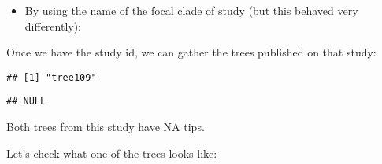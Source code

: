 \documentclass[draft]{ametsoc}
\begin{document}
\begin{itemize}
\tightlist
\item
  By using the name of the focal clade of study (but this behaved very
  differently):
\end{itemize}

\begin{Shaded}
\begin{Highlighting}[]
\OperatorTok{::}\NormalTok{(}\NormalTok{, }\NormalTok{)}
\end{Highlighting}
\end{Shaded}

Once we have the study id, we can gather the trees published on that
study:

\begin{Shaded}
\begin{Highlighting}[]
\OperatorTok{::}\OperatorTok{::}\NormalTok{(}\NormalTok{))}
\end{Highlighting}
\end{Shaded}

\begin{verbatim}
## [1] "tree109"
\end{verbatim}

\begin{Shaded}
\begin{Highlighting}[]
\OperatorTok{::}\OperatorTok{::}\NormalTok{(}\NormalTok{))}
\end{Highlighting}
\end{Shaded}

\begin{verbatim}
## NULL
\end{verbatim}

\begin{Shaded}
\begin{Highlighting}[]
\StringTok{ }\OperatorTok{::}\NormalTok{(}\NormalTok{)}
\end{Highlighting}
\end{Shaded}

Both trees from this study have NA tips.

Let's check what one of the trees looks like:
\end{document}
